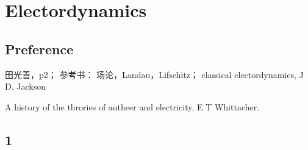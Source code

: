 

\chapter{Electordynamics}

\section{Preference}

田光善，p2；
参考书：
场论，Landau，Lifschitz；
classical electordynamics, J D. Jackson

A history of the throries of autheer and electricity. E T Whittacher.



\section{1}









